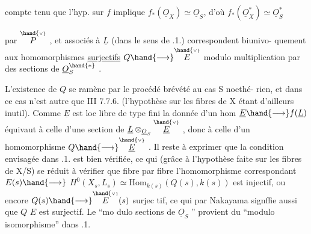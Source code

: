 compte tenu que l'hyp. sur $f$ implique $f_*(\underline{O}_X)\simeq\underline{O}_S$, d'où $f_*(\underline{O}_X^*)\simeq\underline{O}_S^*$

par $\overset{\hand{\scriptscriptstyle\vee}}{P}$ , et associés à $\underline{L}$ (dans le sens de .1.) correspondent biunivo-%
quement aux\hand{*} homomorphismes \uline{surjectifs} $Q\hand{\longrightarrow}\overset{\hand{\scriptscriptstyle\vee}}{E}$\hand{,} modulo multiplication par des sections de $\underline{O}_S^{\hand{*}}$ .\hand{$\blacktriangledown$}

L'existence de $Q$ se ramène par le procédé brévété au cas S noethé-%
rien, et dans ce cas n'est autre que III 7.7.6. (l'hypothèse sur les
fibres de X étant d'ailleurs inutil). Comme $\underline{E}$ est loc libre de type fini
la donnée d'un hom $\underline{E}\hand{\longrightarrow} f(\underline{L})$ équivaut à celle d'une section de
$\underline{L}\otimes_{\underline{O}_S}\overset{\hand{\scriptscriptstyle\vee}}{\underline{E}}$ , donc à celle d'un homomorphisme $Q\hand{\longrightarrow}\overset{\hand{\scriptscriptstyle\vee}}{\underline{E}}$ . Il reste à exprimer
que la condition envisagée dans .1. est bien vérifiée, ce qui (grâce à
l'hypothèse faite sur les fibres de X/S) se réduit à vérifier que
fibre par fibre l'homomorphisme correspondant $E(s)\hand{\longrightarrow}$ \hand{$\vee$}
$H^0(X_s,L_s)\simeq\mathrm{Hom}_{k(s)}(Q(s),k(s))$ est injectif, ou encore $Q(s)\hand{\longrightarrow}\overset{\hand{\scriptscriptstyle\vee}}{E}(s)$ surjec%
tif, ce qui par Nakayama signffie aussi que $Q$ \quad $E$ est surjectif. Le ``mo
dulo sections de $\underline{O}_S$ '' provient du ``modulo isomorphisme'' dans .1.\hand{/}

